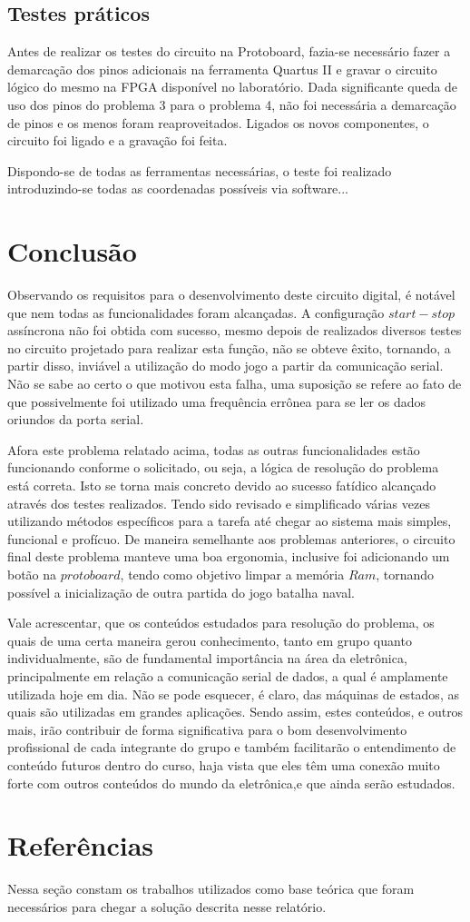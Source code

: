 \documentclass[12pt]{article}
\begin{document}
\subsection{Testes práticos}
Antes de realizar os testes do circuito na Protoboard, fazia-se necessário fazer a demarcação dos pinos adicionais na ferramenta Quartus II e  gravar o circuito lógico do mesmo na FPGA disponível no laboratório. Dada significante queda de uso dos pinos do problema 3 para o problema 4, não foi necessária a demarcação de pinos e os menos foram reaproveitados. Ligados os novos componentes, o circuito foi ligado e a gravação foi feita.


Dispondo-se de todas as ferramentas necessárias, o teste foi realizado introduzindo-se todas as coordenadas possíveis via software... %


\section{Conclusão}

Observando os requisitos para o desenvolvimento deste circuito digital, é notável que nem todas as funcionalidades foram alcançadas. A configuração $start-stop$ assíncrona não foi obtida com sucesso, mesmo depois de realizados diversos testes no circuito projetado para realizar esta função, não se obteve êxito, tornando, a partir disso, inviável a utilização do modo jogo a partir da comunicação serial. Não se sabe ao certo o que motivou esta falha, uma suposição se refere ao fato de que possivelmente foi utilizado uma frequência errônea para se ler os dados oriundos da porta serial.

Afora este problema relatado acima, todas as outras funcionalidades estão funcionando conforme o solicitado, ou seja, a lógica de resolução do problema está correta. Isto se torna mais concreto devido ao sucesso fatídico alcançado através dos testes realizados. Tendo sido revisado e simplificado várias vezes utilizando métodos específicos para a tarefa até chegar ao sistema mais simples, funcional e profícuo. De maneira semelhante aos problemas anteriores, o circuito final deste problema manteve uma boa ergonomia, inclusive foi adicionando um botão na $protoboard$, tendo como objetivo limpar a memória $Ram$, tornando possível a inicialização de outra partida do jogo batalha naval. 

Vale acrescentar, que os conteúdos estudados para resolução do problema, os quais de uma certa maneira gerou conhecimento, tanto em grupo quanto individualmente, são de fundamental importância na área da eletrônica, principalmente em relação a comunicação serial de dados, a qual é amplamente utilizada hoje em dia. Não se pode esquecer, é claro, das máquinas de estados, as quais são utilizadas em grandes aplicações. Sendo assim, estes conteúdos, e outros mais, irão contribuir de forma significativa para o bom desenvolvimento profissional de cada integrante do grupo e também facilitarão o entendimento de conteúdo futuros dentro do curso, haja vista que eles têm uma conexão muito forte com outros conteúdos do mundo da eletrônica,e que ainda serão estudados.


\section{Referências}

Nessa seção constam os trabalhos utilizados como base teórica que foram necessários para chegar a solução descrita nesse relatório.




\end{document}
